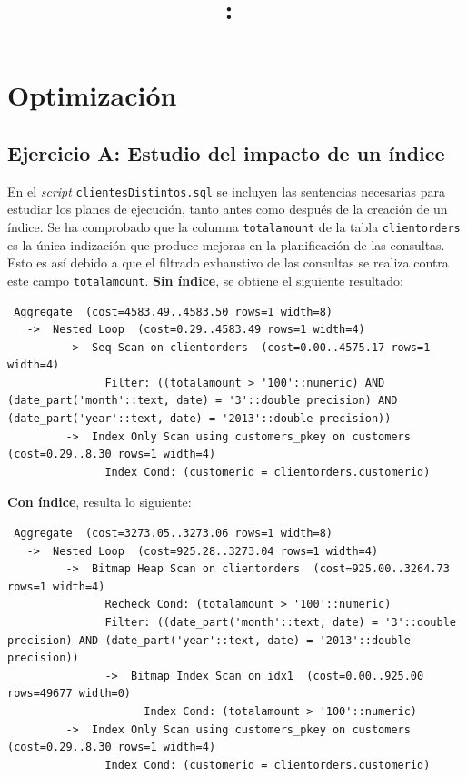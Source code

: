\documentclass{article}
\title{
    \vspace{2in}
    \textmd{\textbf{\hmwkClass:\ \hmwkTitle}}\\
    \vspace{3in}
}
\author{\textbf{\hmwkAuthorName}}
\begin{document}
\maketitle



\newpage
\tableofcontents
\newpage
\section{Optimización}
\subsection{Ejercicio A: {\small Estudio del impacto de un índice}}
En el \textit{script} \texttt{clientesDistintos.sql} se incluyen las sentencias necesarias para estudiar los planes de ejecución, tanto antes como después de la creación de un índice. Se ha comprobado que la columna \texttt{totalamount} de la tabla \texttt{clientorders} es la única indización que produce mejoras en la planificación de las consultas. Esto es así debido a que el filtrado exhaustivo de las consultas se realiza contra este campo \texttt{totalamount}.
\medbreak
\textbf{Sin índice}, se obtiene el siguiente resultado:
\begin{lstlisting}
 Aggregate  (cost=4583.49..4583.50 rows=1 width=8)
   ->  Nested Loop  (cost=0.29..4583.49 rows=1 width=4)
         ->  Seq Scan on clientorders  (cost=0.00..4575.17 rows=1 width=4)
               Filter: ((totalamount > '100'::numeric) AND (date_part('month'::text, date) = '3'::double precision) AND (date_part('year'::text, date) = '2013'::double precision))
         ->  Index Only Scan using customers_pkey on customers  (cost=0.29..8.30 rows=1 width=4)
               Index Cond: (customerid = clientorders.customerid)
\end{lstlisting}
\textbf{Con índice}, resulta lo siguiente:
\begin{lstlisting}
 Aggregate  (cost=3273.05..3273.06 rows=1 width=8)
   ->  Nested Loop  (cost=925.28..3273.04 rows=1 width=4)
         ->  Bitmap Heap Scan on clientorders  (cost=925.00..3264.73 rows=1 width=4)
               Recheck Cond: (totalamount > '100'::numeric)
               Filter: ((date_part('month'::text, date) = '3'::double precision) AND (date_part('year'::text, date) = '2013'::double precision))
               ->  Bitmap Index Scan on idx1  (cost=0.00..925.00 rows=49677 width=0)
                     Index Cond: (totalamount > '100'::numeric)
         ->  Index Only Scan using customers_pkey on customers  (cost=0.29..8.30 rows=1 width=4)
               Index Cond: (customerid = clientorders.customerid)
\end{lstlisting}
\end{document}
